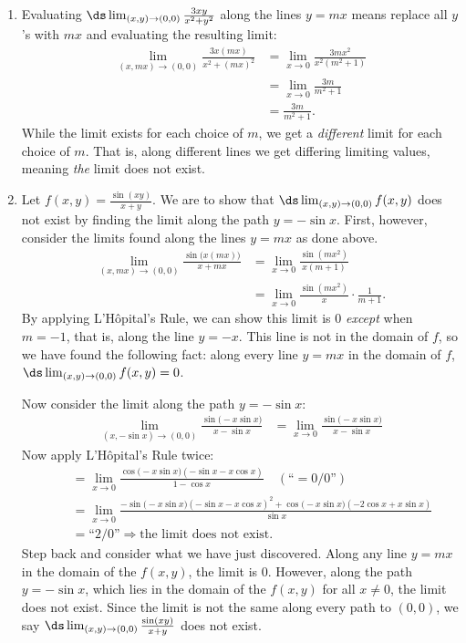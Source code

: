 {\begin{enumerate}
	\item Evaluating $\ds \lim_{(x,y)\to (0,0)} \frac{3xy}{x^2+y^2}$ along the lines $y=mx$ means replace all $y$'s with $mx$ and evaluating the resulting limit:
	\begin{align*}
	\lim_{(x,mx)\to (0,0)} \frac{3x(mx)}{x^2+(mx)^2} &=\lim_{x\to 0} \frac{3mx^2}{x^2(m^2+1)}\\
				&= \lim_{x\to 0} \frac{3m}{m^2+1}\\
				&= \frac{3m}{m^2+1}.
	\end{align*}
	While the limit exists for each choice of $m$, we get a \emph{different} limit for each choice of $m$. That is, along different lines we get differing limiting values, meaning \emph{the} limit does not exist.
	
	\item		Let $f(x,y) = \frac{\sin(xy)}{x+y}$. We are to show that $\ds \lim_{(x,y)\to (0,0)} f(x,y)$ does not exist by finding the limit along the path $y=-\sin x$. First, however, consider the limits found along the lines $y=mx$ as done above.
	\begin{align*}
	\lim_{(x,mx)\to (0,0)} \frac{\sin\big(x(mx)\big)}{x+mx} &= \lim_{x\to 0} \frac{\sin (mx^2)}{x(m+1)} \\
	&= \lim_{x\to 0} \frac{\sin(mx^2)}{x}\cdot\frac1{m+1}.
	\end{align*}
	By applying L'H\^opital's Rule, we can show this limit is 0 \emph{except} when $m=-1$, that is, along the line $y=-x$. This line is not in the domain of $f$, so we have found the following fact: along every line $y=mx$ in the domain of $f$, $\ds \lim_{(x,y)\to(0,0)} f(x,y)=0$. %
\drawexampleline
	
	Now consider the limit along the path $y=-\sin x$:
	\begin{align*}
	\lim_{(x,-\sin x)\to (0,0)} \frac{\sin\big(-x\sin x\big)}{x-\sin x} &= \lim_{x\to0} \frac{\sin\big(-x\sin x\big)}{x-\sin x}
	\end{align*}
	Now apply L'H\^opital's Rule twice:
	\small
	\begin{align*}
	 \quad &= \lim_{x\to 0}\frac{\cos\big(-x\sin x\big)(-\sin x-x\cos x)}{1-\cos x} \quad \left(\text{``}= 0/0\text{''}\right)\\
	&= \lim_{x\to 0}\frac{-\sin\big(-x\sin x\big)(-\sin x-x\cos x)^2+\cos\big(-x\sin x\big)(-2\cos x+x\sin x)}{\sin x}\\
	&= \text{``2/0''} \Rightarrow \text{the limit does not exist.}
	\end{align*}
	\normalsize
Step back and consider what we have just discovered. Along any line $y=mx$ in the domain of the $f(x,y)$, the limit is 0. However, along the path $y=-\sin x$, which lies in the domain of the $f(x,y)$ for all $x\neq 0$, the limit does not exist. Since the limit is not the same along every path to $(0,0)$, we say $\ds \lim_{(x,y)\to (0,0)}\frac{\sin(xy)}{x+y}$ does not exist.
\end{enumerate}
\baselineskip
}\\

